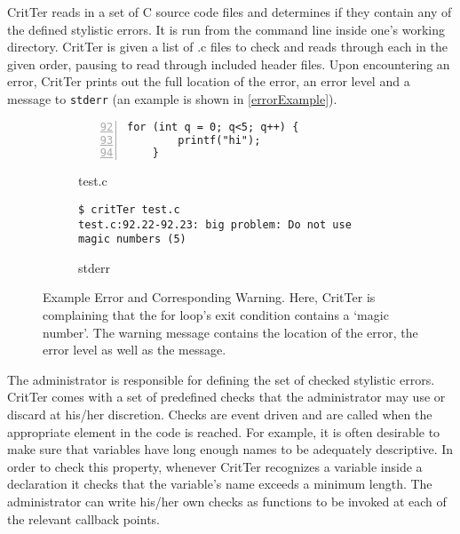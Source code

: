 \documentclass[12pt]{report}
\newcommand{\programName}{CritTer\xspace}
\begin{document}
\programName reads in a set of C source code files and determines if they contain any of the 
defined stylistic errors. It is run from the command line inside one's working directory. \programName is 
given a list of .c files to check and reads through each in the given order, pausing to read through 
included header files. Upon encountering an error, \programName prints out the full location of the error, 
an error level and a message to \lstinline{stderr} (an example is shown in \autoref{errorExample}). 

\begin{figure}
\begin{subfigure}[b]{.49\linewidth}
\caption{test.c}
\label{errorExampleCode}
\begin{lstlisting}[numbers=left, firstnumber=92, xleftmargin=.8cm]
	for (int q = 0; q<5; q++) {
		printf("hi");
	}
\end{lstlisting}
\end{subfigure}
\begin{subfigure}[b]{.49\linewidth}
\caption{stderr}
\label{errorExampleStderr}
\begin{lstlisting}[xleftmargin=.7cm]
$ critTer test.c
test.c:92.22-92.23: big problem: Do not use magic numbers (5)
\end{lstlisting}
\end{subfigure}
\caption[Example Error and Corresponding Warning]{Example Error and Corresponding Warning. Here, \programName is complaining that the for loop's exit condition contains a `magic number'. The warning message contains the location of the error, the error level as well as the message.}
\label{errorExample}
\end{figure}

The administrator is responsible for defining the set of checked stylistic errors. \programName 
comes with a set of predefined checks that the administrator may use or discard at his\slash her 
discretion. Checks are event driven and are called when the appropriate element in the code is reached. 
For example, it is often desirable to make sure that variables have long enough names to be adequately 
descriptive. In order to check this property, whenever \programName recognizes a variable inside a 
declaration it checks that the variable's name exceeds a minimum length. The administrator can write 
his\slash her own checks as functions to be invoked at each of the relevant callback points.
\end{document}
